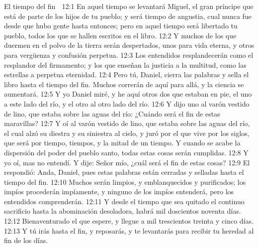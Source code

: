 El tiempo del fin  

12:1 En aquel tiempo se levantará Miguel, el gran príncipe que está de parte de los hijos de tu pueblo; y será tiempo de angustia, cual nunca fue desde que hubo gente hasta entonces; pero en aquel tiempo será libertado tu pueblo, todos los que se hallen escritos en el libro.  
12:2 Y muchos de los que duermen en el polvo de la tierra serán despertados, unos para vida eterna, y otros para vergüenza y confusión perpetua. 
12:3 Los entendidos resplandecerán como el resplandor del firmamento; y los que enseñan la justicia a la multitud, como las estrellas a perpetua eternidad.  
12:4 Pero tú, Daniel, cierra las palabras y sella el libro hasta el tiempo del fin. Muchos correrán de aquí para allá, y la ciencia se aumentará.  
12:5 Y yo Daniel miré, y he aquí otros dos que estaban en pie, el uno a este lado del río, y el otro al otro lado del río.  
12:6 Y dijo uno al varón vestido de lino, que estaba sobre las aguas del río: ¿Cuándo será el fin de estas maravillas?  
12:7 Y oí al varón vestido de lino, que estaba sobre las aguas del río, el cual alzó su diestra y su siniestra al cielo, y juró por el que vive por los siglos, que será por tiempo, tiempos, y la mitad de un tiempo. Y cuando se acabe la dispersión del poder del pueblo santo, todas estas cosas serán cumplidas.  
12:8 Y yo oí, mas no entendí. Y dije: Señor mío, ¿cuál será el fin de estas cosas?  
12:9 El respondió: Anda, Daniel, pues estas palabras están cerradas y selladas hasta el tiempo del fin.  
12:10 Muchos serán limpios, y emblanquecidos y purificados; los impíos procederán impíamente, y ninguno de los impíos entenderá, pero los entendidos comprenderán.  
12:11 Y desde el tiempo que sea quitado el continuo sacrificio hasta la abominación desoladora, habrá mil doscientos noventa días.  
12:12 Bienaventurado el que espere, y llegue a mil trescientos treinta y cinco días.  
12:13 Y tú irás hasta el fin, y reposarás, y te levantarás para recibir tu heredad al fin de los días.

